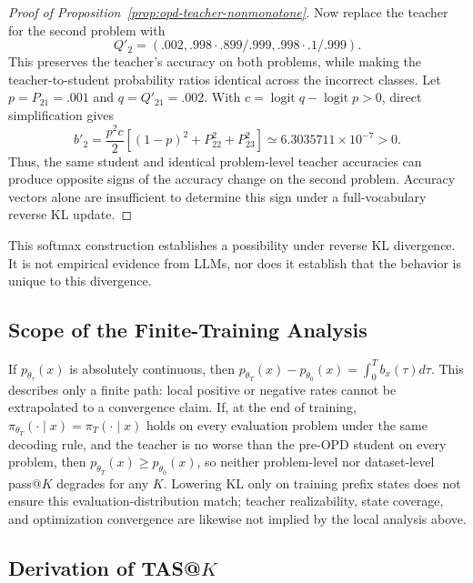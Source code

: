 \documentclass{article}
\theoremstyle{opdplain}
\begin{document}
\begin{proof}[Proof of Proposition~\ref{prop:opd-teacher-nonmonotone}]
Now replace the teacher for the second problem with
\[
 Q'_2=(.002,.998\!\cdot\!.899/.999,.998\!\cdot\!.1/.999).
\]
This preserves the teacher's accuracy on both problems, while making the teacher-to-student probability ratios identical across the incorrect classes. Let $p=P_{21}=.001$ and $q=Q'_{21}=.002$. With $c=\operatorname{logit}q-\operatorname{logit}p>0$, direct simplification gives
\[
 b'_2=\frac{p^2c}{2}\left[(1-p)^2+P_{22}^2+P_{23}^2\right]
 \simeq6.3035711\times10^{-7}>0.
\]
Thus, the same student and identical problem-level teacher accuracies can produce opposite signs of the accuracy change on the second problem. Accuracy vectors alone are insufficient to determine this sign under a full-vocabulary reverse KL update.
\end{proof}
This softmax construction establishes a possibility under reverse KL divergence. It is not empirical evidence from LLMs, nor does it establish that the behavior is unique to this divergence.

\subsection{Scope of the Finite-Training Analysis}

If $p_{\theta_\tau}(x)$ is absolutely continuous, then $p_{\theta_T}(x)-p_{\theta_0}(x)=\int_0^T b_x(\tau)d\tau$. This describes only a finite path: local positive or negative rates cannot be extrapolated to a convergence claim. If, at the end of training, $\pi_{\theta_T}(\cdot\mid x)=\pi_T(\cdot\mid x)$ holds on every evaluation problem under the same decoding rule, and the teacher is no worse than the pre-OPD student on every problem, then $p_{\theta_T}(x)\ge p_{\theta_0}(x)$, so neither problem-level nor dataset-level pass@$K$ degrades for any $K$. Lowering KL only on training prefix states does not ensure this evaluation-distribution match; teacher realizability, state coverage, and optimization convergence are likewise not implied by the local analysis above.

\subsection{Derivation of TAS@$K$}
\label{app:pairwise-teacher-proof}
\end{document}
